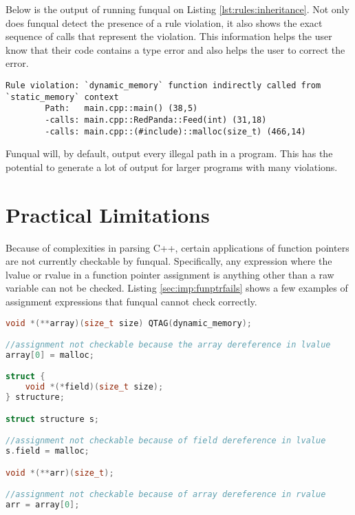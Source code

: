 Below is the output of running funqual on Listing \ref{lst:rules:inheritance}.  Not only does funqual detect the presence of a rule violation, it also shows the exact sequence of calls that represent the violation.  This information helps the user know that their code contains a type error and also helps the user to correct the error.

\noindent\begin{minipage}[t]{\linewidth}
\begin{lstlisting}
Rule violation: `dynamic_memory` function indirectly called from `static_memory` context
        Path:   main.cpp::main() (38,5)
        -calls: main.cpp::RedPanda::Feed(int) (31,18)
        -calls: main.cpp::(#include)::malloc(size_t) (466,14)
\end{lstlisting}
\end{minipage}

Funqual will, by default, output every illegal path in a program.  This has the potential to generate a lot of output for larger programs with many violations.  

\section{Practical Limitations}

Because of complexities in parsing C++, certain applications of function pointers are not currently checkable by funqual.  Specifically, any expression where the lvalue or rvalue in a function pointer assignment is anything other than a raw variable can not be checked.  Listing \ref{sec:imp:funptrfails} shows a few examples of assignment expressions that funqual cannot check correctly.

\noindent\begin{minipage}[t]{\linewidth}
\begin{lstlisting}[language=c++,label={sec:imp:funptrfails},caption={Examples of function pointer assignment expressions that are not checked correctly by funqual}]
void *(**array)(size_t size) QTAG(dynamic_memory);

//assignment not checkable because the array dereference in lvalue
array[0] = malloc;

struct {
    void *(*field)(size_t size);
} structure;

struct structure s;

//assignment not checkable because of field dereference in lvalue
s.field = malloc;

void *(**arr)(size_t);

//assignment not checkable because of array dereference in rvalue
arr = array[0];
\end{lstlisting}
\end{minipage}

